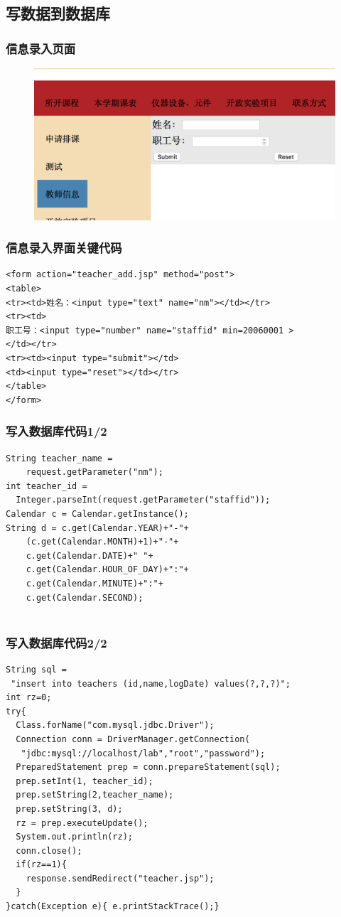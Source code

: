 \documentclass{beamer}
\begin{document}
\subsection{写数据到数据库}
\begin{frame}
\frametitle{信息录入页面}
\begin{figure}
\includegraphics[width=1\linewidth]{sql3.png}
\end{figure}
\end{frame}
\begin{frame}[fragile]
\frametitle{信息录入界面关键代码}
\begin{lstlisting}
<form action="teacher_add.jsp" method="post">
<table>
<tr><td>姓名：<input type="text" name="nm"></td></tr>
<tr><td>
职工号：<input type="number" name="staffid" min=20060001 >
</td></tr>
<tr><td><input type="submit"></td>
<td><input type="reset"></td></tr>
</table>
</form>

\end{lstlisting}
\end{frame}

\begin{frame}[fragile]
\frametitle{写入数据库代码1/2}
\begin{lstlisting}
String teacher_name = 
    request.getParameter("nm");
int teacher_id = 
  Integer.parseInt(request.getParameter("staffid"));
Calendar c = Calendar.getInstance();
String d = c.get(Calendar.YEAR)+"-"+
    (c.get(Calendar.MONTH)+1)+"-"+
    c.get(Calendar.DATE)+" "+
    c.get(Calendar.HOUR_OF_DAY)+":"+
    c.get(Calendar.MINUTE)+":"+
    c.get(Calendar.SECOND);


\end{lstlisting}
\end{frame}

\begin{frame}[fragile]
\frametitle{写入数据库代码2/2}
\begin{lstlisting}
String sql = 
 "insert into teachers (id,name,logDate) values(?,?,?)";
int rz=0;
try{		
  Class.forName("com.mysql.jdbc.Driver");
  Connection conn = DriverManager.getConnection(
   "jdbc:mysql://localhost/lab","root","password");
  PreparedStatement prep = conn.prepareStatement(sql);
  prep.setInt(1, teacher_id);
  prep.setString(2,teacher_name);
  prep.setString(3, d);
  rz = prep.executeUpdate();
  System.out.println(rz);
  conn.close();
  if(rz==1){	
    response.sendRedirect("teacher.jsp");
  }
}catch(Exception e){ e.printStackTrace();}
\end{lstlisting}
\end{frame}
\end{document}
